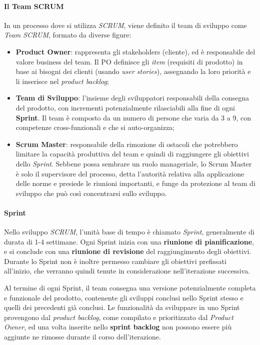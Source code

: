 \documentclass[a4paper,12pt]{report}
\begin{document}
				\paragraph{Il Team SCRUM}
				In un processo dove si utilizza \emph{SCRUM}, viene definito il team di sviluppo come \emph{Team SCRUM}, formato da diverse figure:
				\begin{itemize}
					\item \textbf{Product Owner}: rappresenta gli stakeholders (cliente), ed è responsabile del valore business del team. Il PO definisce gli \emph{item} (requisiti di prodotto) in base ai bisogni dei clienti (usando \emph{user stories}), assegnando la loro priorità e li inserisce nel \emph{product backlog};
					\item \textbf{Team di Sviluppo}: l'insieme degli sviluppatori responsabili della consegna del prodotto, con incrementi potenzialmente rilasciabili alla fine di ogni \textbf{Sprint}. Il team è composto da un numero di persone che varia da 3 a 9, con competenze cross-funzionali e che si auto-organizza;
					\item \textbf{Scrum Master}: responsabile della rimozione di ostacoli che potrebbero limitare la capacità produttiva del team e quindi di raggiungere gli obiettivi dello \emph{Sprint}. Sebbene possa sembrare un ruolo manageriale,
					lo Scrum Master è solo il supervisore del processo, detta l'autorità relativa alla applicazione delle norme e presiede le riunioni importanti, e funge da protezione al team di sviluppo che può così concentrarsi sullo sviluppo.
				\end{itemize}
			
				\paragraph{Sprint}
				Nello sviluppo \emph{SCRUM}, l'unità base di tempo è chiamato \emph{Sprint}, generalmente di durata di 1-4 settimane. Ogni Sprint inizia con una \textbf{riunione di pianificazione}, e si conclude con una \textbf{riunione di revisione} del raggiungimento degli obiettivi. Durante lo Sprint non è inoltre permesso cambiare gli obiettivi prefissati all'inizio, che verranno quindi tenute in considerazione nell'iterazione successiva.
				
				Al termine di ogni Sprint, il team consegna una versione potenzialmente completa e funzionale del prodotto, contenente gli sviluppi conclusi nello Sprint stesso e quelli dei precedenti già conclusi.
				Le funzionalità da sviluppare in uno Sprint provengono dal \emph{product backlog}, come compilato e prioritizzato dal \emph{Product Owner}, ed una volta inserite nello \textbf{sprint backlog} non possono essere più aggiunte ne rimosse durante il corso dell'iterazione.
				
\end{document}
